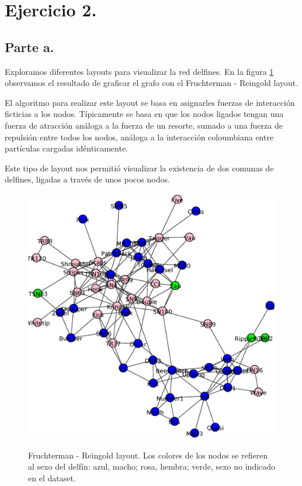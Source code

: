 
\section{Ejercicio 2.}

\subsection{Parte a.}

\par Exploramos diferentes layouts para visualizar la red delfines.
En la figura \ref{fig:Layout_delfines} observamos el resultado de graficar
el grafo con el Fruchterman - Reingold layout. 
\par El algoritmo para realizar este layout se basa en asignarles fuerzas de interacción ficticias a los nodos. Típicamente se basa en que los nodos ligados tengan una fuerza de atracción análoga a la fuerza de un resorte, sumado a una fuerza de repulsión entre todos los nodos, análoga a la interacción coloumbiana entre partículas cargadas idénticamente.
\par Este tipo de layout nos permitió visualizar la existencia de dos comunas de delfines, ligadas a través de unos pocos nodos.

\begin{figure}[h]
\centering
\includegraphics[scale = 0.50]{figuras/FrutRein}
\label{fig:Layout_delfines}
\caption{Fruchterman - Reingold layout. Los colores de los nodos se refieren al sexo del delfín: azul, macho; rosa, hembra; verde, sexo no indicado en el dataset.}
\end{figure}

